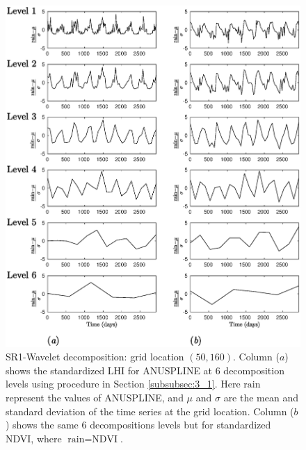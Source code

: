 {\begin{figure}[!htbp]
\begin{center}
\includegraphics[width=0.8\columnwidth]{fig/point50_160GG}
\vspace*{-0.2in}
\caption{SR1-Wavelet decomposition: grid location $(50,160)$. 
Column ($a$) shows the standardized LHI for ANUSPLINE at $6$ decomposition levels using procedure in Section \ref{subsubsec:3_1}. Here $\text{rain}$ represent the values of ANUSPLINE, and $\mu$ and $\sigma$ are the mean and standard deviation of the time series at the grid location. Column ($b$) shows the same $6$ decompositions levels but for standardized NDVI, where $\text{rain} = \text{NDVI}$.}
\label{fig:level_decomposition1}
\end{center}
\end{figure}

}
